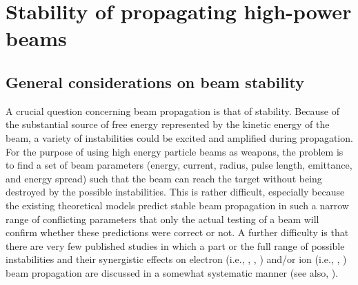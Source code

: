 \documentclass [12pt,a4paper,     ]{report} %
\begin{document}
\chapter{Stability of propagating high-power beams}
\label{sta:00}

\section{General considerations on beam stability}
\label{sta:0}


A crucial question concerning beam propagation is that of stability.  Because of the substantial source of free energy represented by the kinetic energy of the beam, a variety of instabilities could be excited and amplified during propagation.  For the purpose of using high energy particle beams as weapons, the problem is to find a set of beam parameters (energy, current, radius, pulse length, emittance, and energy spread) such that the beam can reach the target without being destroyed by the possible instabilities.  This is rather difficult, especially because the existing theoretical models predict stable  beam propagation in such a narrow range of conflicting parameters that only the actual testing of a beam will confirm whether these predictions were correct or not.  A further difficulty is that there are very few published studies in which a part or the full range of possible instabilities and their synergistic effects on electron (i.e., \cite{BUDKE1956A}, \cite{IVANO1970-}, \cite{BENFO1973-}) and/or ion (i.e., \cite{CALLA1977-}, \cite{JORNA1978-}) beam propagation are discussed in a somewhat systematic manner (see also, \cite{MILLE1982-}). 
\end{document}
